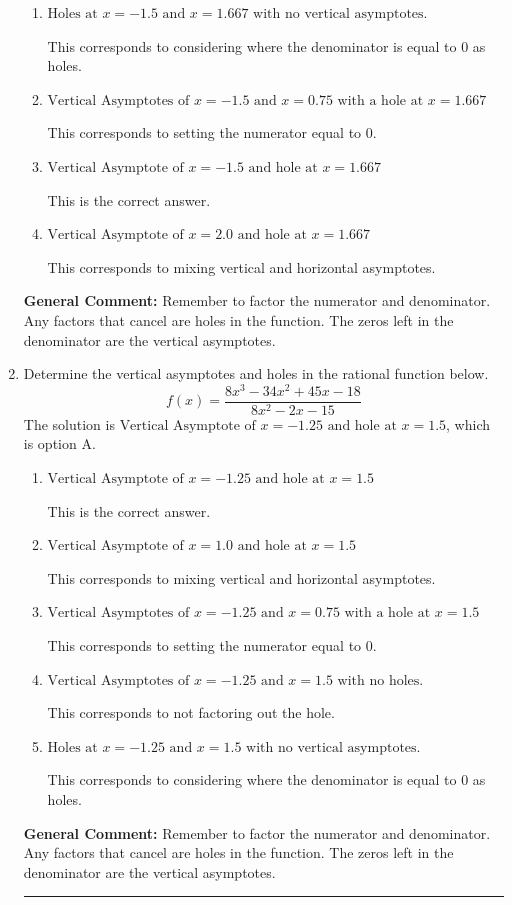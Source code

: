 \documentclass{extbook}[14pt]
\newcommand{\litem}[1]{\item #1

\rule{\textwidth}{0.4pt}}
\begin{document}
\begin{enumerate}
{\begin{enumerate}[label=\Alph*.]
This corresponds to not factoring out the hole.
\item \( \text{Holes at } x = -1.5 \text{ and } x = 1.667 \text{ with no vertical asymptotes.} \)

This corresponds to considering where the denominator is equal to 0 as holes.
\item \( \text{Vertical Asymptotes of } x = -1.5 \text{ and } x = 0.75 \text{ with a hole at } x = 1.667 \)

This corresponds to setting the numerator equal to 0.
\item \( \text{Vertical Asymptote of } x = -1.5 \text{ and hole at } x = 1.667 \)

This is the correct answer.
\item \( \text{Vertical Asymptote of } x = 2.0 \text{ and hole at } x = 1.667 \)

This corresponds to mixing vertical and horizontal asymptotes.
\end{enumerate}

\textbf{General Comment:} Remember to factor the numerator and denominator. Any factors that cancel are holes in the function. The zeros left in the denominator are the vertical asymptotes.
}
\litem{
Determine the vertical asymptotes and holes in the rational function below.
\[ f(x) = \frac{8x^{3} -34 x^{2} +45 x -18}{8x^{2} -2 x -15} \]The solution is \( \text{Vertical Asymptote of } x = -1.25 \text{ and hole at } x = 1.5 \), which is option A.\begin{enumerate}[label=\Alph*.]
\item \( \text{Vertical Asymptote of } x = -1.25 \text{ and hole at } x = 1.5 \)

This is the correct answer.
\item \( \text{Vertical Asymptote of } x = 1.0 \text{ and hole at } x = 1.5 \)

This corresponds to mixing vertical and horizontal asymptotes.
\item \( \text{Vertical Asymptotes of } x = -1.25 \text{ and } x = 0.75 \text{ with a hole at } x = 1.5 \)

This corresponds to setting the numerator equal to 0.
\item \( \text{Vertical Asymptotes of } x = -1.25 \text{ and } x = 1.5 \text{ with no holes.} \)

This corresponds to not factoring out the hole.
\item \( \text{Holes at } x = -1.25 \text{ and } x = 1.5 \text{ with no vertical asymptotes.} \)

This corresponds to considering where the denominator is equal to 0 as holes.
\end{enumerate}

\textbf{General Comment:} Remember to factor the numerator and denominator. Any factors that cancel are holes in the function. The zeros left in the denominator are the vertical asymptotes.
}
\end{enumerate}
\end{document}
